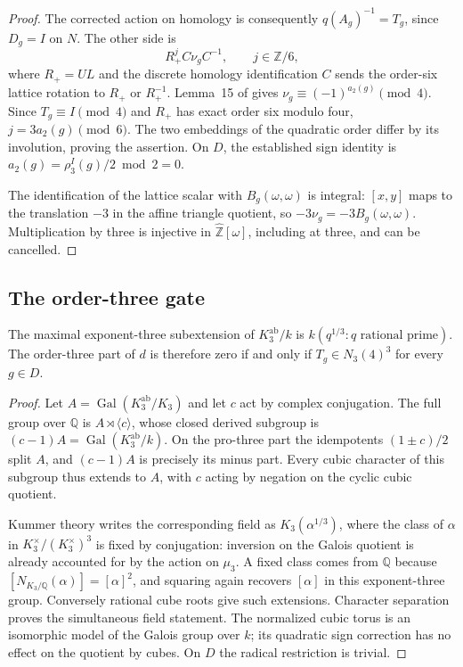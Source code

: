 \begin{proof}
The corrected action on homology is consequently
$q(A_g)^{-1}=T_g$, since $D_g=I$ on $N$. The other side is
\[
 R_+^j C\nu_gC^{-1},\qquad j\in\mathbb Z/6,
\]
where $R_+=UL$ and the discrete homology identification $C$ sends the order-six
lattice rotation to $R_+$ or $R_+^{-1}$.
Lemma~15 of \cite{H17} gives
$\nu_g\equiv(-1)^{a_2(g)}\pmod4$.
Since $T_g\equiv I\pmod4$ and $R_+$ has exact order six modulo
four, $j=3a_2(g)\pmod6$. The two embeddings of the quadratic
order differ by its involution, proving the assertion.
On $D$, the established sign identity is
$a_2(g)=\rho_3^I(g)/2\bmod2=0$.

The identification of the lattice scalar with $B_g(\omega,\omega)$
is integral: $[x,y]$ maps to the translation $-3$ in the affine
triangle quotient, so $-3\nu_g=-3B_g(\omega,\omega)$.
Multiplication by three is injective in
$\widehat{\mathbb Z}[\omega]$, including at three, and can be cancelled.
\end{proof}

\subsection{The order-three gate}

\begin{lemma}\label{lem:lr-cubic-cm-quotient}
The maximal exponent-three subextension of $K_3^{\mathrm{ab}}/k$
is $k(q^{1/3}:q\text{ rational prime})$. The order-three part
of $d$ is therefore zero if and only if
$T_g\in N_3(4)^3$ for every $g\in D$.
\end{lemma}
\begin{proof}
Let $A=\operatorname{Gal}(K_3^{\mathrm{ab}}/K_3)$ and let $c$
act by complex conjugation. The full group over $\mathbb Q$ is
$A\rtimes\langle c\rangle$, whose closed derived subgroup is
$(c-1)A=\operatorname{Gal}(K_3^{\mathrm{ab}}/k)$.
On the pro-three part the idempotents $(1\pm c)/2$ split $A$,
and $(c-1)A$ is precisely its minus part.
Every cubic character of this subgroup thus extends to $A$,
with $c$ acting by negation on the cyclic cubic quotient.

Kummer theory writes the corresponding field as
$K_3(\alpha^{1/3})$, where the class of $\alpha$ in
$K_3^\times/(K_3^\times)^3$ is fixed by conjugation: inversion
on the Galois quotient is already accounted for by the action
on $\mu_3$. A fixed class comes from $\mathbb Q$ because
$[N_{K_3/\mathbb Q}(\alpha)]=[\alpha]^2$, and squaring again
recovers $[\alpha]$ in this exponent-three group.
Conversely rational cube roots give such extensions.
Character separation proves the simultaneous field statement.
The normalized cubic torus is an isomorphic model of the Galois
group over $k$; its quadratic sign correction has no effect on
the quotient by cubes. On $D$ the radical restriction is trivial.
\end{proof}

